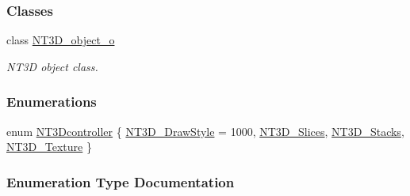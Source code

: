 \subsubsection*{Classes}
\begin{DoxyCompactItemize}
\item 
class \hyperlink{class_n_t3_d__object__o}{NT3D\_\-object\_\-o}
\begin{DoxyCompactList}\small\item\em NT3D object class. \item\end{DoxyCompactList}\end{DoxyCompactItemize}
\subsubsection*{Enumerations}
\begin{DoxyCompactItemize}
\item 
enum \hyperlink{nt3d__object__obj_8h_ae59ecf13a3631bc4a9ea41f90de08351}{NT3Dcontroller} \{ \hyperlink{nt3d__object__obj_8h_ae59ecf13a3631bc4a9ea41f90de08351a51d295eaad5050b61a19ce123e935b0b}{NT3D\_\-DrawStyle} =  1000, 
\hyperlink{nt3d__object__obj_8h_ae59ecf13a3631bc4a9ea41f90de08351a6da32e5b468e6b5b8d01d66650542428}{NT3D\_\-Slices}, 
\hyperlink{nt3d__object__obj_8h_ae59ecf13a3631bc4a9ea41f90de08351a4d010e00effed7f925020a4b98c78d22}{NT3D\_\-Stacks}, 
\hyperlink{nt3d__object__obj_8h_ae59ecf13a3631bc4a9ea41f90de08351adae8288a948db1280f7bbc20912c814a}{NT3D\_\-Texture}
 \}
\end{DoxyCompactItemize}


\subsubsection{Enumeration Type Documentation}
